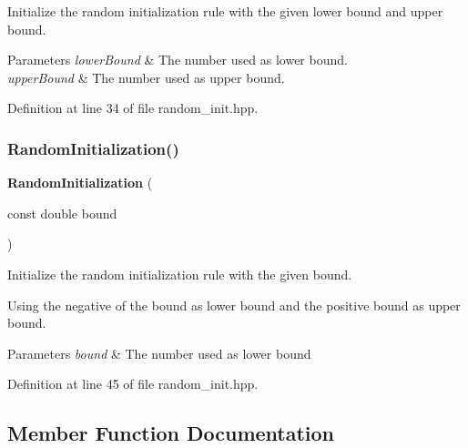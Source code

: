 Initialize the random initialization rule with the given lower bound and upper bound. 


\begin{DoxyParams}{Parameters}
{\em lower\+Bound} & The number used as lower bound. \\
\hline
{\em upper\+Bound} & The number used as upper bound. \\
\hline
\end{DoxyParams}


Definition at line 34 of file random\+\_\+init.\+hpp.

\mbox{\label{classmlpack_1_1ann_1_1RandomInitialization_a829fd29a4d9b066c6d519f8d89a7f8e4}} 
\subsubsection{Random\+Initialization()\hspace{0.1cm}{\footnotesize\ttfamily [2/2]}}
{\footnotesize\ttfamily \textbf{ Random\+Initialization} (\begin{DoxyParamCaption}\item[{const double}]{bound }\end{DoxyParamCaption})\hspace{0.3cm}{\ttfamily [inline]}}



Initialize the random initialization rule with the given bound. 

Using the negative of the bound as lower bound and the positive bound as upper bound.


\begin{DoxyParams}{Parameters}
{\em bound} & The number used as lower bound \\
\hline
\end{DoxyParams}


Definition at line 45 of file random\+\_\+init.\+hpp.



\subsection{Member Function Documentation}
\mbox{\label{classmlpack_1_1ann_1_1RandomInitialization_a5cfe472251a41fffd45b170bb0d3c1bd}} 
